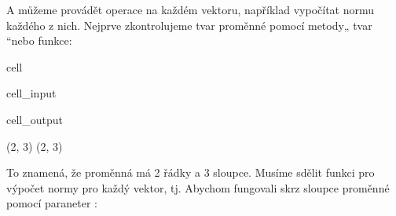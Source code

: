 \documentclass[letterpaper,10pt,english]{jupyterBook}
\begin{document}
\sphinxAtStartPar
A můžeme provádět operace na každém vektoru, například vypočítat normu každého z nich.
Nejprve zkontrolujeme tvar proměnné  pomocí metody„ tvar “nebo funkce:

\begin{sphinxuseclass}{cell}\begin{sphinxVerbatimInput}

\begin{sphinxuseclass}{cell_input}
\begin{sphinxVerbatim}[commandchars=\\\{\}]
\end{sphinxVerbatim}

\end{sphinxuseclass}\end{sphinxVerbatimInput}
\begin{sphinxVerbatimOutput}

\begin{sphinxuseclass}{cell_output}
\begin{sphinxVerbatim}[commandchars=\\\{\}]
(2, 3)
(2, 3)
\end{sphinxVerbatim}

\end{sphinxuseclass}\end{sphinxVerbatimOutput}

\end{sphinxuseclass}
\sphinxAtStartPar
To znamená, že proměnná  má 2 řádky a 3 sloupce.
Musíme sdělit funkci  pro výpočet normy pro každý vektor, tj. Abychom fungovali skrz sloupce proměnné pomocí paraneter :
\end{document}

